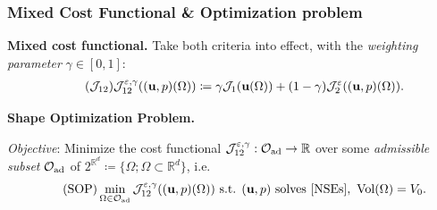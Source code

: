 \documentclass[10pt,xcolor=table,english]{beamer}   %
\begin{document}
\begin{frame}
    \frametitle{Mixed Cost Functional \& Optimization problem}
    \textbf{Mixed cost functional.} Take both criteria into effect, with the \textit{weighting parameter}  $\gamma \in [0,1]$:
    \begin{align}
    \label{J12}
    \tag{$\mathcal{J}_{12}$}
    \mathcal{J}_{12}^{\varepsilon,\gamma}(({\bf u},p)(\Omega))\coloneqq \gamma\mathcal{J}_1({\bf u}(\Omega)) + (1 - \gamma)\mathcal{J}_2^\varepsilon(({\bf u},p)(\Omega)).
    \end{align}
    \vspace{1cm}
    
    \textbf{Shape Optimization Problem.}
    \smallskip
    
    \textit{Objective}: Minimize the cost functional $\mathcal{J}_{12}^{\varepsilon,\gamma}:\mathcal{O}_{\rm ad}\to\mathbb{R}$ over some \textit{admissible subset} $\mathcal{O}_{\rm ad}$ of $2^{\mathbb{R}^d}\coloneqq \{\Omega;\Omega\subset\mathbb{R}^d\}$, i.e.
    \smallskip
    \begin{align}
    \tag{SOP}
    \min_{\Omega\in\mathcal{O}_{\rm ad}} \mathcal{J}_{12}^{\varepsilon,\gamma}(({\bf u},p)(\Omega)) \mbox{ s.t. } ({\bf u},p) \mbox{ solves \eqref{NSEs}},\ {\rm Vol}(\Omega) = V_0.
    \end{align}
\end{frame}



\end{document}
